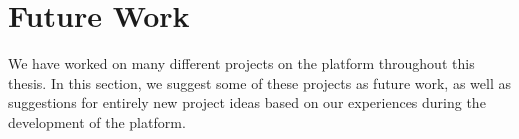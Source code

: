 






\section{Future Work}
\label{chap:future}

We have worked on many different projects on the {\rg} platform throughout this thesis.
In this section, we suggest some of these projects as future work, as well as suggestions for entirely new project ideas based on our experiences during the development of the {\rg} platform.

